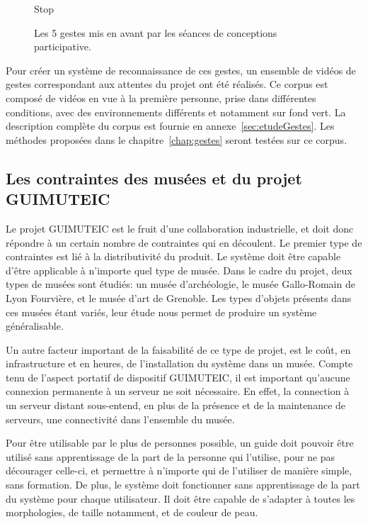 \begin{figure}[!htb]
\begin{minipage}[c]{.32\linewidth}
		\caption*{Stop}%
	\end{minipage}
	\caption{Les 5 gestes mis en avant par les séances de conceptions participative.}
	\label{fig:photoGestes}
\end{figure}

Pour créer un système de reconnaissance de ces gestes, un ensemble de vidéos de gestes correspondant aux attentes du projet ont été réalisés. 
Ce corpus est composé de vidéos en vue à la première personne, prise dans différentes conditions, avec des environnements différents et notamment sur fond vert. 
La description complète du corpus est fournie en annexe~\ref{sec:etudeGestes}. 
Les méthodes proposées dans le chapitre~\ref{chap:gestes} seront testées sur ce corpus.





%
%
\subsection{Les contraintes des musées et du projet GUIMUTEIC}
\label{sec:contraintesGUIMUTEIC}

Le projet GUIMUTEIC est le fruit d'une collaboration industrielle, et doit donc répondre à un certain nombre de contraintes qui en découlent.
Le premier type de contraintes est lié à la distributivité du produit. Le système doit être capable d'être applicable à n'importe quel type de musée. 
Dans le cadre du projet, deux types de musées sont étudiés: un musée d'archéologie, le musée Gallo-Romain de Lyon Fourvière, et le musée d'art de Grenoble. 
Les types d'objets présents dans ces musées étant variés, leur étude nous permet de produire un système généralisable. 

Un autre facteur important de la faisabilité de ce type de projet, est le coût, en infrastructure et en heures, de l'installation du système dans un musée. 
Compte tenu de l'aspect portatif de dispositif GUIMUTEIC, il est important qu'aucune connexion permanente à un serveur ne soit nécessaire. 
En effet, la connection à un serveur distant sous-entend, en plus de la présence et de la maintenance de serveurs, une connectivité dans l'ensemble du musée. 

Pour être utilisable par le plus de personnes possible, un guide doit pouvoir être utilisé sans apprentissage de la part de la personne qui l'utilise, pour ne pas décourager celle-ci, et permettre à n'importe qui de l'utiliser de manière simple, sans formation. 
De plus, le système doit fonctionner sans apprentissage de la part du système pour chaque utilisateur. 
Il doit être capable de s'adapter à toutes les morphologies, de taille notamment, et de couleur de peau.

